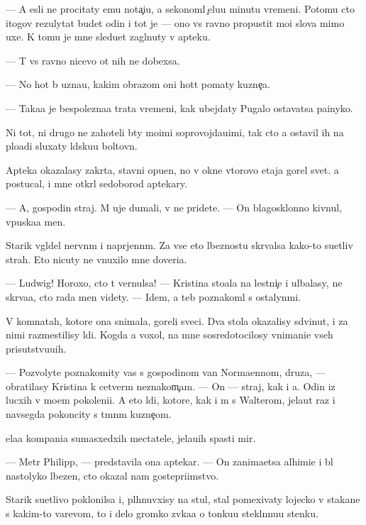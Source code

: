 \documentclass[10pt]{book}
\begin{document}
— A {\y}esli ne procitaty {\y}emu nota{\c}i{\y}u, {\y}a sekonoml{\iu} {\c}elu{\y}u minutu vremeni. Potomu cto itogov{\yi}{\y} rezulytat budet odin i tot je — ono vs{\e} ravno propustit mo{\y}i slova mimo uxe{\y}. K tomu je mne sledu{\y}et zagl{\ia}nuty v apteku.

— T{\yi} vs{\e} ravno nicevo ot nih ne dob{\y}exsa.

— No hot{\ia} b{\yi} uzna{\y}u, kakim obrazom oni hot{\ia}t po{\y}maty kuzne{\c}a.

— Taka{\y}a je bespolezna{\y}a trata vremeni, kak ubejdaty Pugalo ostavatsa pa{\y}inyko{\y}.

Ni tot, ni drugo{\y} ne zahoteli b{\yi}ty mo{\y}imi soprovojda{\y}u{\x}imi, tak cto {\y}a ostavil ih na plo{\x}adi sluxaty l{\iu}dsku{\y}u boltovn{\iu}.

Apteka okazalasy zakr{\yi}ta, stavni opu{\x}en{\yi}, no v okne vtorovo etaja gorel svet. {\Y}a postucal, i mne otkr{\yi}l sedoborod{\yi}{\y} aptekary.

— A, gospodin straj. M{\yi} uje dumali, v{\yi} ne pridete. — On blagosklonno kivnul, vpuska{\y}a men{\ia}.

Starik v{\yi}gl{\ia}del nervn{\yi}m i napr{\ia}jenn{\yi}m. Za vse{\y} eto{\y} l{\iu}beznost{\y}u skr{\yi}valsa kako{\y}-to su{\y}etliv{\yi}{\y} strah. Eto nicuty ne vnuxilo mne doveri{\y}a.

— Ludwig! Horoxo, cto t{\yi} vernulsa! — Kristina sto{\y}ala na lestni{\c}e i ul{\yi}balasy, ne skr{\yi}va{\y}a, cto rada men{\ia} videty. — Idem, {\y}a teb{\ia} poznakoml{\iu} s ostalyn{\yi}mi.

V komnatah, kotor{\yi}{\y}e ona snimala, goreli sveci. Dva stola okazalisy sdvinut{\yi}, i za nimi razmestilisy l{\iu}di. Kogda {\y}a  voxol, na mne sosredotocilosy vnimani{\y}e vseh prisutstvu{\y}u{\x}ih.

— Pozvolyte poznakomity vas s gospodinom van Norma{\y}ennom, druz{\y}a, — obratilasy Kristina k cetver{\yi}m neznakom{\c}am. — On — straj, kak i {\y}a. Odin iz lucxih v mo{\y}em pokoleni{\y}i. A eto l{\iu}di, kotor{\yi}{\y}e, kak i m{\yi} s Walterom, jela{\y}ut raz i navsegda pokoncity s t{\e}mn{\yi}m kuzne{\c}om.

{\C}ela{\y}a kompani{\y}a sumasxedxih mectatele{\y}, jela{\y}u{\x}ih spasti mir.

— Metr Philipp, — predstavila ona aptekar{\ia}. — On zanima{\y}etsa alhimi{\y}e{\y} i b{\yi}l nastolyko l{\iu}bezen, cto okazal nam gostepri{\y}imstvo.

Starik su{\y}etlivo poklonilsa i, pl{\iu}hnuvxisy na stul, stal pomexivaty lojecko{\y} v stakane s kakim-to varevom, to i delo gromko zv{\ia}ka{\y}a o tonku{\y}u stekl{\ia}nnu{\y}u stenku.
\end{document}
